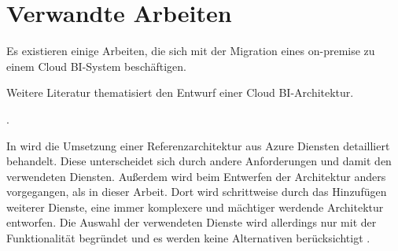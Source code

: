 \section{Verwandte Arbeiten} \label{ch:verwandteArbeiten}
Es existieren einige Arbeiten, die sich mit der Migration eines on-premise zu einem Cloud BI-System beschäftigen.

\cite{ouf_cloud_2011}



Weitere Literatur thematisiert den Entwurf einer Cloud BI-Architektur.

\cite[vgl.][]{oliver_norkus_rabic_2016}.

In  wird die Umsetzung einer Referenzarchitektur aus Azure Diensten detailliert behandelt. Diese unterscheidet sich durch andere Anforderungen und damit den verwendeten Diensten. Außerdem wird beim Entwerfen der Architektur anders vorgegangen, als in dieser Arbeit. Dort wird schrittweise durch das Hinzufügen weiterer Dienste, eine immer komplexere und mächtiger werdende Architektur entworfen. Die Auswahl der verwendeten Dienste wird allerdings nur mit der Funktionalität begründet und es werden keine Alternativen berücksichtigt \cite[vgl.][]{borosch_cloud_2021}.